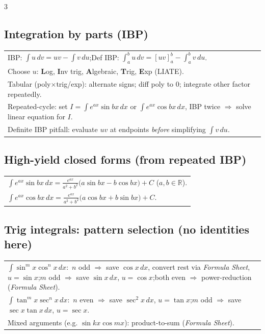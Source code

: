 \documentclass[10pt]{article}
\newcommand{\R}{\mathbb{R}}
\newcommand{\FS}{\textit{Formula Sheet}}
\newcommand{\dx}{\,dx}
\begin{document}
\begin{multicols}{3}
\subsection*{Integration by parts (IBP)}
\vspace{-1pt}
\begin{tabular}{@{}p{}@{}}
IBP: $\displaystyle\int u\,dv=uv-\int v\,du$;\quad Def IBP: $\displaystyle\int_a^b u\,dv=[uv]_a^b-\int_a^b v\,du$.\\
Choose $u$: \textbf{L}og, \textbf{I}nv trig, \textbf{A}lgebraic, \textbf{T}rig, \textbf{E}xp (LIATE).\\
Tabular (poly$\times$trig/exp): alternate signs; diff poly to $0$; integrate other factor repeatedly.\\
Repeated-cycle: set $I=\int e^{ax}\sin bx\dx$ or $\int e^{ax}\cos bx\dx$, IBP twice $\Rightarrow$ solve linear equation for $I$.\\
Definite IBP pitfall: evaluate $uv$ at endpoints \emph{before} simplifying $\int v\,du$.\\
\end{tabular}

\subsection*{High-yield closed forms (from repeated IBP)}
\vspace{-1pt}
\begin{tabular}{@{}p{}@{}}
$\displaystyle\int e^{ax}\sin bx\dx=\frac{e^{ax}}{a^2+b^2}\big(a\sin bx-b\cos bx\big)+C$ ($a,b\in\R$).\\
$\displaystyle\int e^{ax}\cos bx\dx=\frac{e^{ax}}{a^2+b^2}\big(a\cos bx+b\sin bx\big)+C$.\\
\end{tabular}

\subsection*{Trig integrals: pattern selection (no identities here)}
\vspace{-1pt}
\begin{tabular}{@{}p{}@{}}
$\int\sin^m x\cos^n x\dx$:\ \(n\) odd $\Rightarrow$ save $\cos x\dx$, convert rest via \FS, $u=\sin x$;\quad \(m\) odd $\Rightarrow$ save $\sin x\dx$, $u=\cos x$;\quad both even $\Rightarrow$ power-reduction (\FS).\\
$\int\tan^m x\sec^n x\dx$:\ \(n\) even $\Rightarrow$ save $\sec^2x\dx$, $u=\tan x$;\quad \(m\) odd $\Rightarrow$ save $\sec x\tan x\dx$, $u=\sec x$.\\
Mixed arguments (e.g. $\sin kx\cos mx$): product-to-sum (\FS).\\
\end{tabular}


\end{multicols}
\end{document}
